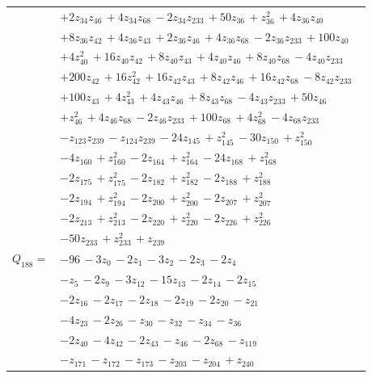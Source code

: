 \begin{longtable}{@{}r p{0.88\linewidth}@{}}
 & $+2z_{34}z_{46}\,+4z_{34}z_{68}\,-2z_{34}z_{233}\,+50z_{36}\,+z_{36}^{2}\,+4z_{36}z_{40}$\\
 & $+8z_{36}z_{42}\,+4z_{36}z_{43}\,+2z_{36}z_{46}\,+4z_{36}z_{68}\,-2z_{36}z_{233}\,+100z_{40}$\\
 & $+4z_{40}^{2}\,+16z_{40}z_{42}\,+8z_{40}z_{43}\,+4z_{40}z_{46}\,+8z_{40}z_{68}\,-4z_{40}z_{233}$\\
 & $+200z_{42}\,+16z_{42}^{2}\,+16z_{42}z_{43}\,+8z_{42}z_{46}\,+16z_{42}z_{68}\,-8z_{42}z_{233}$\\
 & $+100z_{43}\,+4z_{43}^{2}\,+4z_{43}z_{46}\,+8z_{43}z_{68}\,-4z_{43}z_{233}\,+50z_{46}$\\
 & $+z_{46}^{2}\,+4z_{46}z_{68}\,-2z_{46}z_{233}\,+100z_{68}\,+4z_{68}^{2}\,-4z_{68}z_{233}$\\
 & $-z_{123}z_{239}\,-z_{124}z_{239}\,-24z_{145}\,+z_{145}^{2}\,-30z_{150}\,+z_{150}^{2}$\\
 & $-4z_{160}\,+z_{160}^{2}\,-2z_{164}\,+z_{164}^{2}\,-24z_{168}\,+z_{168}^{2}$\\
 & $-2z_{175}\,+z_{175}^{2}\,-2z_{182}\,+z_{182}^{2}\,-2z_{188}\,+z_{188}^{2}$\\
 & $-2z_{194}\,+z_{194}^{2}\,-2z_{200}\,+z_{200}^{2}\,-2z_{207}\,+z_{207}^{2}$\\
 & $-2z_{213}\,+z_{213}^{2}\,-2z_{220}\,+z_{220}^{2}\,-2z_{226}\,+z_{226}^{2}$\\
 & $-50z_{233}\,+z_{233}^{2}\,+z_{239}$\\[5pt]
$Q_{188}=$ & $-96\,-3z_{0}\,-2z_{1}\,-3z_{2}\,-2z_{3}\,-2z_{4}$\\
 & $-z_{5}\,-2z_{9}\,-3z_{12}\,-15z_{13}\,-2z_{14}\,-2z_{15}$\\
 & $-2z_{16}\,-2z_{17}\,-2z_{18}\,-2z_{19}\,-2z_{20}\,-z_{21}$\\
 & $-4z_{23}\,-2z_{26}\,-z_{30}\,-z_{32}\,-z_{34}\,-z_{36}$\\
 & $-2z_{40}\,-4z_{42}\,-2z_{43}\,-z_{46}\,-2z_{68}\,-z_{119}$\\
 & $-z_{171}\,-z_{172}\,-z_{173}\,-z_{203}\,-z_{204}\,+z_{240}$\\[5pt]
\bottomrule\end{longtable}
\endgroup
